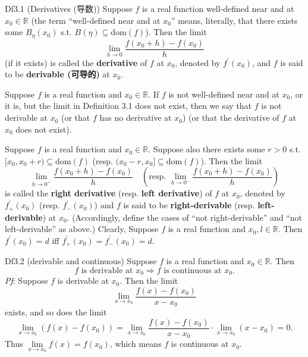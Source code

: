 \documentclass{article}
\begin{document}
\begin{Df}{Df3.1 (Derivatives (导数))}
    Suppose $f$ is a real function well-defined near and at $x_0\in\mathbb{R}$ (the term ``well-defined near and at $x_0$'' means, literally, that there exists some $B_\eta(x_0)$ s.t. $B(\eta)\subseteq \text{dom}(f)$). Then the limit
    $$ \lim_{h\to 0} \frac{f(x_0+h)-f(x_0)}{h} $$
    (if it exists) is called the \textbf{derivative} of $f$ at $x_0$, denoted by $f^\prime(x_0)$, and $f$ is said to be \textbf{derivable (可导的)} at $x_0$. 
\end{Df}

\begin{Rmk}{}
    \begin{compactenum}
        \item \textcolor{Df}{Suppose $f$ is a real function and $x_0\in\mathbb{R}$. If $f$ is not well-defined near and at $x_0$, or it is, but the limit in Definition 3.1 does not exist, then we say that $f$ is not derivable at $x_0$ (or that $f$ has no derivative at $x_0$) (or that the derivative of $f$ at $x_0$ does not exist).}
        \item \textcolor{Df}{Suppose $f$ is a real function and $x_0\in\mathbb{R}$. Suppose also there exists some $r>0$ s.t. $[x_0, x_0+r)\subseteq \text{dom}(f)$ (resp. $(x_0-r, x_0]\subseteq \text{dom}(f)$). Then the limit 
        $$ \lim_{h\to 0^+} \frac{f(x_0+h)-f(x_0)}{h}\quad \left(\text{resp. } \lim_{h\to 0^-} \frac{f(x_0+h)-f(x_0)}{h}\right) $$
        is called the \textbf{right derivative} (resp. \textbf{left derivative}) of $f$ at $x_0$, denoted by $f_+^\prime (x_0)$ (resp. $f_-^\prime (x_0)$) and $f$ is said to be \textbf{right-derivable} (resp. \textbf{left-derivable}) at $x_0$. (Accordingly, define the cases of ``not right-derivable'' and ``not left-derivable'' as above.)} Clearly, \textcolor{Th}{Suppose $f$ is a real function and $x_0, l\in\mathbb{R}$. Then $f^\prime(x_0) = d$ iff $f_+^\prime(x_0) = f_-^\prime(x_0) = d$.}
    \end{compactenum}
\end{Rmk}

\begin{Th}{Df3.2 (derivable and continuous)}
    Suppose $f$ is a real function and $x_0\in\mathbb{R}$. Then 
    $$ f \text{ is derivable at } x_0 \Rightarrow f \text{ is continuous at } x_0. $$
    \tcblower
    \textit{Pf}: Suppose $f$ is derivable at $x_0$. Then the limit
    $$ \lim_{x\to x_0} \frac{f(x)-f(x_0)}{x-x_0} $$
    exists, and so does the limit 
    $$\lim\limits_{x\to x_0} (f(x)-f(x_0)) = \lim\limits_{x\to x_0} \frac{f(x)-f(x_0)}{x-x_0}\cdot \lim\limits_{x\to x_0} (x-x_0) = 0.$$ 
    Thus $\lim\limits_{x\to x_0} f(x) = f(x_0)$, which means $f$ is continuous at $x_0$. 
\end{Th}
\end{document}
